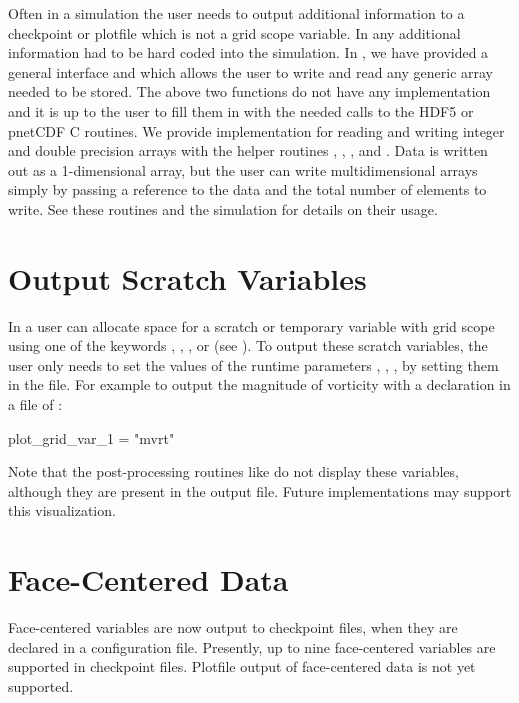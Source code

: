 Often in a simulation the user needs to output additional information to a checkpoint or plotfile
which is not a grid scope variable.  In \flashx any additional information had to be hard coded
into the simulation.  In \flashx, we have provided a general interface 
and  which allows the user to write and read any generic array needed to
be stored.  The above two functions do not have any implementation and it is up to the user to
fill them in with the needed calls to the HDF5 or pnetCDF C routines.  We provide implementation
for reading and writing integer and double precision arrays with the helper routines
, , , and
.  Data is written
out as a 1-dimensional array, but the user can write multidimensional arrays simply by passing a
reference to the data and the total number of elements to write. See these
routines and the simulation  for details on their usage.


\section{Output Scratch Variables}
\label{lbl:OutputScratchVariables}
In \flashx a user can allocate space for a scratch or temporary
variable with grid scope using one of the
 keywords , ,
, or
 (see ). 
To output these scratch variables, the user
only needs to set the values of the runtime parameters
,
, \etc, by
setting them in the  file.
For example to output the magnitude of vorticity
with a declaration in a  file of :
\begin{codeseg}
plot_grid_var_1 = "mvrt"
\end{codeseg}
Note that the post-processing routines like  do not display these variables,
although they are present in the output file.  Future implementations may support this visualization.

\section{Face-Centered Data}
Face-centered variables are now output to checkpoint files, when they are declared in a configuration file.  Presently, up to nine face-centered variables are supported in checkpoint files.  Plotfile output of face-centered data is not yet supported.

